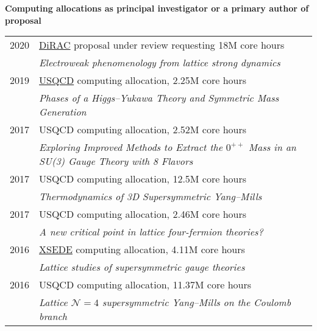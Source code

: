 \begin{spacelist}
  \vspace{18 pt}
  \item {\large \bfseries Computing allocations as principal investigator or a primary author of proposal} \\[10 pt]
    \begin{tabular}[t]{cl}
      2020 & \href{https://dirac.ac.uk}{DiRAC} proposal under review requesting 18M core hours                        \\ %
           & \textit{Electroweak phenomenology from lattice strong dynamics}                                          \\[6 pt]
      2019 & \href{http://www.usqcd.org}{USQCD} computing allocation, 2.25M core hours                                \\ %
           & \textit{Phases of a Higgs--Yukawa Theory and Symmetric Mass Generation}                                  \\[6 pt]
      2017 & USQCD computing allocation, 2.52M core hours                                                             \\ %
           & \textit{Exploring Improved Methods to Extract the $0^{++}$ Mass in an SU(3) Gauge Theory with 8 Flavors} \\[6 pt]
      2017 & USQCD computing allocation, 12.5M core hours                                                             \\ %
           & \textit{Thermodynamics of 3D Supersymmetric Yang--Mills}                                                 \\[6 pt]
      2017 & USQCD computing allocation, 2.46M core hours                                                             \\ %
           & \textit{A new critical point in lattice four-fermion theories?}                                          \\[6 pt]
      2016 & \href{http://www.xsede.org}{XSEDE} computing allocation, 4.11M core hours                                \\ %
           & \textit{Lattice studies of supersymmetric gauge theories}                                                \\[6 pt]
      2016 & USQCD computing allocation, 11.37M core hours                                                            \\ %
           & \textit{Lattice $\mathcal N = 4$ supersymmetric Yang--Mills on the Coulomb branch}                       \\[6 pt]

\end{tabular}
\end{spacelist}
